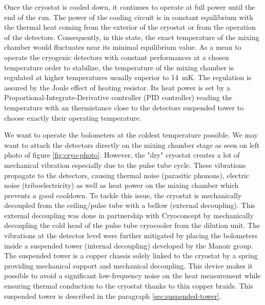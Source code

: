 Once the cryostat is cooled down, it continues to operate at full power until the end of the run. The power of the cooling circuit is in constant equilibrium with the thermal heat coming from the exterior of the cryostat or from the operation of the detectors. Consequently, in this state, the exact temperature of the mixing chamber would fluctuates near its minimal equilibrium value. 
As a mean to operate the cryogenic detectors with constant performances at a chosen temperature order to stabilize, the temperature of the mixing chamber is regulated at higher temperatures usually superior to \SI{14}{\milli\kelvin}. The regulation is assured by the Joule effect of heating resistor. Its heat power is set by a Proportional-Integrate-Derivative controller (PID controller) reading the temperature with an  thermistance close to the detectors suspended tower to choose exactly their operating temperature.


We want to operate the bolometers at the coldest temperature possible. We may want to attach the detectors directly on the mixing chamber stage as seen on left photo of figure \ref{fig:cryo-photo}. However, the "dry" cryostat creates a lot of mechanical vibration especially due to the pulse tube cycle. These vibrations propagate to the detectors, causing thermal noise (parasitic phonons), electric noise (triboelectricity) as well as heat power on the mixing chamber which prevents a good cooldown.
To tackle this issue, the cryostat is mechanically decoupled from the ceiling/pulse tube with a bellow (external decoupling). This external decoupling was done in partnership with Cryoconcept by mechanically decoupling the cold head of the pulse tube cryocooler from the dilution unit. The vibrations at the detector level were further mitigated by placing the bolometers inside a suspended tower (internal decoupling) developed by the Manoir group.
The suspended tower is a copper chassis solely linked to the cryostat by a spring providing mechanical support and mechanical decoupling. This device makes it possible to avoid a significant low-frequency noise on the heat measurement while ensuring thermal conduction to the cryostat thanks to thin copper braids. This suspended tower is described in the paragraph \ref{sec:suspended-tower}.

